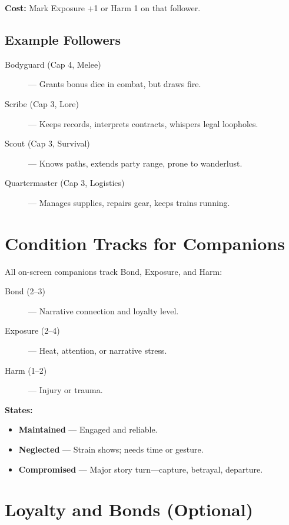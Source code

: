 \textbf{Cost:} Mark Exposure +1 or Harm 1 on that follower.

\subsection*{Example Followers}

\begin{description}
  \item[Bodyguard (Cap 4, Melee)] — Grants bonus dice in combat, but draws fire.
  \item[Scribe (Cap 3, Lore)] — Keeps records, interprets contracts, whispers legal loopholes.
  \item[Scout (Cap 3, Survival)] — Knows paths, extends party range, prone to wanderlust.
  \item[Quartermaster (Cap 3, Logistics)] — Manages supplies, repairs gear, keeps trains running.
\end{description}

\section{Condition Tracks for Companions}

All on-screen companions track Bond, Exposure, and Harm:

\begin{description}
  \item[Bond (2–3)] — Narrative connection and loyalty level.
  \item[Exposure (2–4)] — Heat, attention, or narrative stress.
  \item[Harm (1–2)] — Injury or trauma.
\end{description}

\textbf{States:}
\begin{itemize}
  \item \textbf{Maintained} — Engaged and reliable.
  \item \textbf{Neglected} — Strain shows; needs time or gesture.
  \item \textbf{Compromised} — Major story turn—capture, betrayal, departure.
\end{itemize}

\section{Loyalty and Bonds (Optional)}

